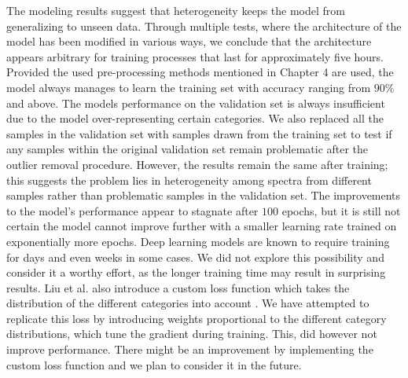 The modeling results suggest that heterogeneity keeps the model from generalizing to unseen data. Through multiple tests, where the architecture of the model has been modified in various ways, we conclude that the architecture appears arbitrary for training processes that last for approximately five hours. Provided the used pre-processing methods mentioned in Chapter 4 are used, the model always manages to learn the training set with accuracy ranging from $90\%$ and above. The models performance on the validation set is always insufficient due to the model over-representing certain categories. We also replaced all the samples in the validation set with samples drawn from the training set to test if any samples within the original validation set remain problematic after the outlier removal procedure. However, the results remain the same after training; this suggests the problem lies in heterogeneity among spectra from different samples rather than problematic samples in the validation set. The improvements to the model's performance appear to stagnate after $100$ epochs, but it is still not certain the model cannot improve further with a smaller learning rate trained on exponentially more epochs. Deep learning models are known to require training for days and even weeks in some cases. We did not explore this possibility and consider it a worthy effort, as the longer training time may result in surprising results. Liu et al. also introduce a custom loss function which takes the distribution of the different categories into account \cite{liu2017deep}. We have attempted to replicate this loss by introducing weights proportional to the different category distributions, which tune the gradient during training. This, did however not improve performance. There might be an improvement by implementing the custom loss function and we plan to consider it in the future.

